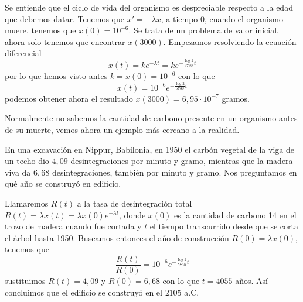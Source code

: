 \documentclass[../main.tex]{subfiles}
\begin{document}
Se entiende que el ciclo de vida del organismo
es despreciable respecto a la edad que debemos datar. Tenemos que 
\(x' = -\lambda x\), a tiempo \(0\), cuando el organismo muere, tenemos que
\(x(0) = 10^{-6}\). Se trata de un problema de valor inicial, ahora solo tenemos
que encontrar \(x(3000)\). Empezamos resolviendo la ecuación diferencial
\[x(t) = k e^{-\lambda t} = k e^{-\frac{\log 2}{5730} t}\]
por lo que hemos visto antes \(k = x(0) = 10^{-6}\) con lo que
\[x(t) = 10^{-6} e^{-\frac{\log 2}{5730} t}\]
podemos obtener ahora el resultado \(x(3000) = 6,95 \cdot 10^{-7}\) gramos.

Normalmente no sabemos la cantidad de carbono presente en un organismo antes de
su muerte, vemos ahora un ejemplo más cercano a la realidad. 

\begin{example}
	En una excavación en Nippur, Babilonia, en 1950 el carbón vegetal de la viga
	de un techo dio \(4,09\) desintegraciones por minuto y gramo, mientras que 
	la madera viva da \(6,68\) desintegraciones, también por minuto y gramo. 
	Nos preguntamos en qué año se construyó en edificio.
\end{example}

Llamaremos \(R(t)\) a la tasa de desintegración total
\(R(t) = \lambda x(t) = \lambda x(0) e^{-\lambda t}\), donde \(x(0)\) es la
cantidad de carbono 14 en el trozo de madera cuando fue cortada y \(t\) el 
tiempo transcurrido desde que se corta el árbol hasta 1950. Buscamos entonces
el año de construcción \(R(0) = \lambda x(0)\), tenemos que
\[\frac{R(t)}{R(0)} = 10^{-6} e^{-\frac{\log 2}{5730} t}\]
sustituimos \(R(t) = 4,09\) y \(R(0) = 6,68\) con lo que \(t = 4055\) años. Así
concluimos que el edificio se construyó en el \(2105\) a.C.
\end{document}
